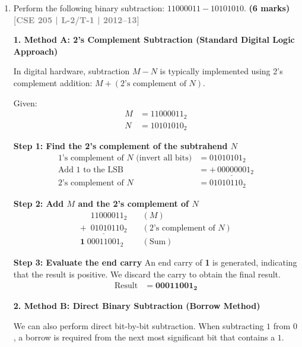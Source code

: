 \documentclass[12pt,a3paper]{article}
\newcommand{\yr}[1]{\hfill\textcolor{gray}{\small\textbf{[#1]}}}
\newcommand{\mk}[1]{\textcolor{orange!70!black}{\small\textbf{(#1 marks)}}}
\begin{document}
\begin{enumerate}
\begin{tcolorbox}[enhanced,breakable,ansbox,colback=cD!4,colframe=cD,boxrule=0.8pt,arc=5pt,title={\textbf{Answer}},fonttitle=\bfseries\color{white},colbacktitle=cD]
\end{tcolorbox}

\item Perform the following binary subtraction: $11000011 - 10101010$.
\mk{6} \yr{CSE 205 | L-2/T-1 | 2012--13}

\begin{tcolorbox}[enhanced,breakable,ansbox,colback=cD!4,colframe=cD,boxrule=0.8pt,arc=5pt,title={\textbf{Answer}},fonttitle=\bfseries\color{white},colbacktitle=cD]

\textbf{\textcolor{cD}{1. Method A: 2's Complement Subtraction (Standard Digital Logic Approach)}}

In digital hardware, subtraction $M - N$ is typically implemented using 2's complement addition: $M + (\text{2's complement of } N)$. 

Given:
\begin{align*}
    M &= 11000011_2 \\
    N &= 10101010_2
\end{align*}

\textbf{Step 1: Find the 2's complement of the subtrahend $N$}
\begin{align*}
    \text{1's complement of } N \text{ (invert all bits)} &= 01010101_2 \\
    \text{Add 1 to the LSB} &= \underline{+\,00000001_2} \\
    \text{2's complement of } N &= 01010110_2
\end{align*}

\textbf{Step 2: Add $M$ and the 2's complement of $N$}
\begin{align*}
    \phantom{+1}11000011_2 \quad &(M) \\
    \underline{+\phantom{1}01010110_2} \quad &(\text{2's complement of } N) \\
    \mathbf{1}\;00011001_2 \quad &(\text{Sum})
\end{align*}

\textbf{Step 3: Evaluate the end carry}
An end carry of \textbf{1} is generated, indicating that the result is positive. We discard the carry to obtain the final result.
\begin{align*}
    \text{Result} &= \mathbf{00011001_2}
\end{align*}

\vspace{1em}
\textbf{\textcolor{cD}{2. Method B: Direct Binary Subtraction (Borrow Method)}}

We can also perform direct bit-by-bit subtraction. When subtracting $1$ from $0$, a borrow is required from the next most significant bit that contains a $1$.


\end{tcolorbox}
\end{enumerate}
\end{document}
